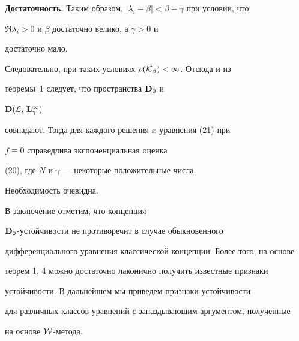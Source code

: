 \begin{pf} {\bf Достаточность.}
Таким образом, $|\lambda_i-\beta|<\beta-\gamma$ при условии, что


$\Re\lambda_i>0$ и $\beta$ достаточно велико, а $\gamma>0$ и


достаточно мало.


Следовательно, при таких условиях $\rho(\cal K_\beta)<1$. Отсюда и из


теоремы~1 следует, что пространства $\bold D_0$ и


$\bold D(\cal L,\,\bold L^\infty_\gamma)$


совпадают. Тогда для каждого решения $x$ уравнения (21) при


$f\equiv 0$ справедлива экспоненциальная оценка


(20), где $N$ и $\gamma$ --- некоторые положительные числа.


Необходимость очевидна.


\end{pf}





В заключение отметим, что концепция


$\bold D_0$-устойчивости не противоречит в случае обыкновенного


дифференциального уравнения классической концепции. Более того, на основе


теорем 1, 4 можно достаточно лаконично получить известные признаки


устойчивости. В дальнейшем мы приведем признаки устойчивости


для различных классов уравнений с запаздывающим аргументом, полученные


на основе $\cal W$-метода.








